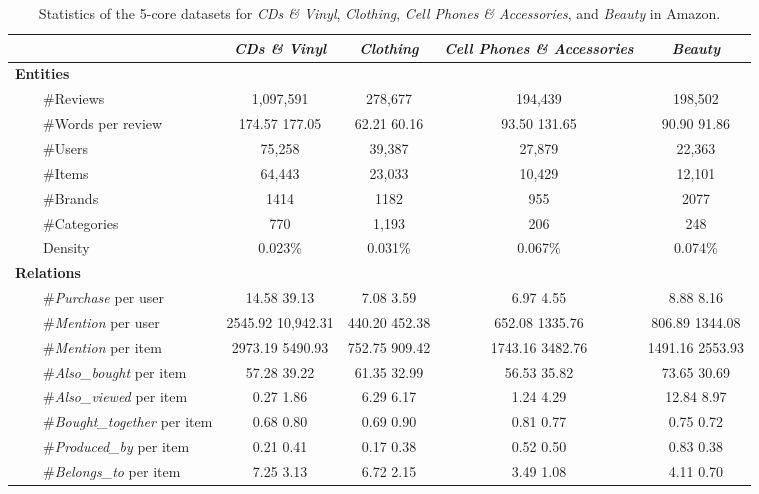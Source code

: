 \documentclass[algorithms,article,accept,moreauthors,pdftex,10pt,a4paper]{Definitions/mdpi}
\begin{document}
\begin{table}[H]
\centering
	\small
	\setlength{\tabcolsep}{2pt}
	\caption{Statistics of the 5-core datasets for \textit{CDs \& Vinyl}, \textit{Clothing}, \textit{Cell Phones \& Accessories}, and \textit{Beauty} in Amazon. 
	}
	\vspace{-5pt}
	\begin{tabular}{ l c  c  c  c   } \toprule
		& \textit{\bf{CDs \& Vinyl}} & \textit{\bf{Clothing}} & \textit{\bf{Cell Phones \& Accessories}} & \textit{\bf{Beauty}}\\
		\midrule
		\textbf{Entities}\\
		~~~~\#Reviews & 1,097,591 & 278,677 & 194,439 & 198,502\\ ~~~~\#Words per review & 174.57  177.05 & 62.21  60.16 & 93.50 131.65 & 90.90  91.86\\
		~~~~\#Users & 75,258 & 39,387 & 27,879 & 22,363 \\ ~~~~\#Items & 64,443 & 23,033 & 10,429 & 12,101\\ ~~~~\#Brands & 1414 & 1182 & 955 & 2077\\ ~~~~\#Categories & 770 & 1,193 & 206 & 248\\ ~~~~Density & 0.023\% & 0.031\% & 0.067\% & 0.074\%\\\midrule
		\textbf{Relations}\\
		~~~~\#\textit{Purchase} per user & 14.58  39.13 & 7.08  3.59 & 6.97  4.55 & 8.88  8.16\\ ~~~~\#\textit{Mention} per user & 2545.92  10,942.31 & 440.20  452.38 & 652.08  1335.76 & 806.89  1344.08\\ ~~~~\#\textit{Mention} per item & 2973.19  5490.93 & 752.75  909.42 & 1743.16  3482.76 & 1491.16  2553.93\\ ~~~~\#\textit{Also\_bought} per item & 57.28  39.22 & 61.35  32.99 & 56.53  35.82 & 73.65  30.69\\ ~~~~\#\textit{Also\_viewed} per item & 0.27  1.86 & 6.29  6.17 & 1.24  4.29 & 12.84  8.97\\ ~~~~\#\textit{Bought\_together} per item & 0.68  0.80 & 0.69  0.90 & 0.81  0.77 & 0.75  0.72\\ ~~~~\#\textit{Produced\_by} per item & 0.21  0.41 & 0.17  0.38 & 0.52  0.50 & 0.83  0.38\\ ~~~~\#\textit{Belongs\_to} per item & 7.25  3.13 & 6.72  2.15 & 3.49  1.08 & 4.11  0.70\\ 

\bottomrule
	\end{tabular}
	\vspace{-5pt}
	\label{tab:dataset_statistics}
\end{table}
\end{document}
